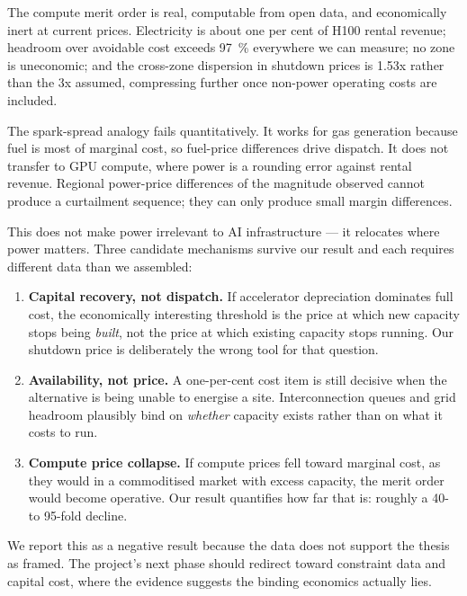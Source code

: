 \documentclass[11pt]{article}
\begin{document}
The compute merit order is real, computable from open data, and
economically inert at current prices. Electricity is about one per cent of
H100 rental revenue; headroom over avoidable cost exceeds
\SI{97}{\percent} everywhere we can measure; no zone is uneconomic; and the
cross-zone dispersion in shutdown prices is \num{1.53}x rather than the
\num{3}x assumed, compressing further once non-power operating costs are
included.

The spark-spread analogy fails quantitatively. It works for gas generation
because fuel is most of marginal cost, so fuel-price differences drive
dispatch. It does not transfer to GPU compute, where power is a rounding
error against rental revenue. Regional power-price differences of the
magnitude observed cannot produce a curtailment sequence; they can only
produce small margin differences.

This does not make power irrelevant to AI infrastructure --- it relocates
where power matters. Three candidate mechanisms survive our result and each
requires different data than we assembled:

\begin{enumerate}
  \item \textbf{Capital recovery, not dispatch.} If accelerator
    depreciation dominates full cost, the economically interesting
    threshold is the price at which new capacity stops being \emph{built},
    not the price at which existing capacity stops running. Our shutdown
    price is deliberately the wrong tool for that question.
  \item \textbf{Availability, not price.} A one-per-cent cost item is still
    decisive when the alternative is being unable to energise a site.
    Interconnection queues and grid headroom plausibly bind on
    \emph{whether} capacity exists rather than on what it costs to run.
  \item \textbf{Compute price collapse.} If compute prices fell toward
    marginal cost, as they would in a commoditised market with excess
    capacity, the merit order would become operative. Our result quantifies
    how far that is: roughly a \num{40}- to \num{95}-fold decline.
  \end{enumerate}

We report this as a negative result because the data does not support the
thesis as framed. The project's next phase should redirect toward
constraint data and capital cost, where the evidence suggests the binding
economics actually lies.



\end{document}
